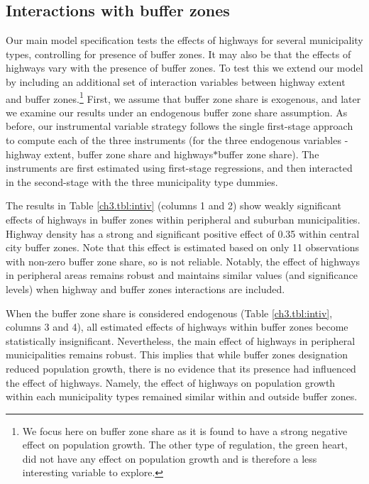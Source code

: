 \documentclass[a4paper,authoryear,review]{elsarticle}  	%
\begin{document}
\subsection{Interactions with buffer zones}
	Our main model specification tests the effects of highways for several municipality types, controlling for presence of buffer zones. It may also be that the effects of highways vary with the presence of buffer zones. To test this we extend our model by including an additional set of interaction variables between highway extent and buffer zones.\footnote{We focus here on buffer zone share as it is found to have a strong negative effect on population growth. The other type of regulation, the green heart, did not have any effect on population growth and is therefore a less interesting variable to explore.} 
	First, we assume that buffer zone share is exogenous, and later we examine our results under an endogenous buffer zone share assumption. As before, our instrumental variable strategy follows the single first-stage approach to compute each of the three instruments (for the three endogenous variables - highway extent, buffer zone share and highways$*$buffer zone share). The instruments are first estimated using first-stage regressions, and then interacted in the second-stage with the three municipality type dummies.
	
	The results in Table \ref{ch3.tbl:intiv} (columns 1 and 2) show weakly significant effects of highways in buffer zones within peripheral and suburban municipalities. Highway density has a strong and significant positive effect of 0.35 within central city buffer zones. Note that this effect is estimated based on only 11 observations with non-zero buffer zone share, so is not reliable. 
	Notably, the effect of highways in peripheral areas remains robust and maintains similar values (and significance levels) when highway and buffer zones interactions are included.
		
		
	When the buffer zone share is considered endogenous (Table \ref{ch3.tbl:intiv}, columns 3 and 4), all estimated effects of highways within buffer zones become statistically insignificant. Nevertheless, the main effect of highways in peripheral municipalities remains robust. 
	This implies that while buffer zones designation reduced population growth, there is no evidence that its presence had influenced the effect of highways. Namely, the effect of highways on population growth within each municipality types remained similar within and outside buffer zones.
	
\end{document}

